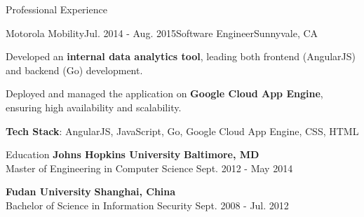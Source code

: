 \documentclass{resume} %
\begin{document}
\begin{rSection}{Professional Experience}
\begin{rSubsection}{Motorola Mobility}{Jul. 2014 - Aug. 2015}{Software Engineer}{Sunnyvale, CA}
\item Developed an \textbf{internal data analytics tool}, leading both frontend (AngularJS) and backend (Go) development.
\item Deployed and managed the application on \textbf{Google Cloud App Engine}, ensuring high availability and scalability.
\item \textbf{Tech Stack}: AngularJS, JavaScript, Go, Google Cloud App Engine, CSS, HTML
\end{rSubsection}


\end{rSection}

\begin{rSection}{Education}
{\bf Johns Hopkins University} \hfill {\bf Baltimore, MD} \\
{Master of Engineering in Computer Science} \hfill {Sept. 2012 - May 2014}

{\bf Fudan University} \hfill {\bf Shanghai, China} \\
{Bachelor of Science in Information Security} \hfill {Sept. 2008 - Jul. 2012}
\end{rSection}
\end{document}

